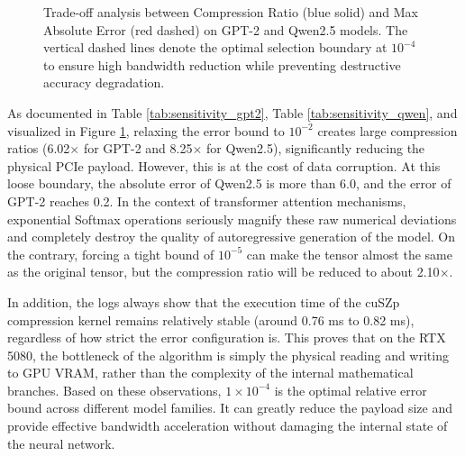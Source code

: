 \documentclass{polyu-comp}
\begin{document}
\begin{figure}[htbp]
\begin{minipage}{0.48\textwidth}
{
        }%
    \end{minipage}
    \caption{Trade-off analysis between Compression Ratio (blue solid) and Max Absolute Error (red dashed) on GPT-2 and Qwen2.5 models. The vertical dashed lines denote the optimal selection boundary at $10^{-4}$ to ensure high bandwidth reduction while preventing destructive accuracy degradation.}
    \label{fig:sensitivity_line_chart}
\end{figure}

As documented in Table \ref{tab:sensitivity_gpt2}, Table \ref{tab:sensitivity_qwen}, and visualized in Figure \ref{fig:sensitivity_line_chart}, relaxing the error bound to $10^{-2}$ creates large compression ratios (6.02$\times$ for GPT-2 and 8.25$\times$ for Qwen2.5), significantly reducing the physical PCIe payload. However, this is at the cost of data corruption. At this loose boundary, the absolute error of Qwen2.5 is more than 6.0, and the error of GPT-2 reaches 0.2. In the context of transformer attention mechanisms, exponential Softmax operations seriously magnify these raw numerical deviations and completely destroy the quality of autoregressive generation of the model. On the contrary, forcing a tight bound of $10^{-5}$ can make the tensor almost the same as the original tensor, but the compression ratio will be reduced to about 2.10$\times$.

In addition, the logs always show that the execution time of the cuSZp compression kernel remains relatively stable (around 0.76 ms to 0.82 ms), regardless of how strict the error configuration is. This proves that on the RTX 5080, the bottleneck of the algorithm is simply the physical reading and writing to GPU VRAM, rather than the complexity of the internal mathematical branches. Based on these observations, $1 \times 10^{-4}$ is the optimal relative error bound across different model families. It can greatly reduce the payload size and provide effective bandwidth acceleration without damaging the internal state of the neural network.
\end{document}
